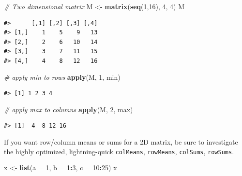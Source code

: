 \documentclass[]{book}
\newenvironment{Shaded}{\begin{snugshade}}{\end{snugshade}}
\newcommand{\KeywordTok}[1]{\textcolor[rgb]{0.13,0.29,0.53}{\textbf{#1}}}
\newcommand{\DataTypeTok}[1]{\textcolor[rgb]{0.13,0.29,0.53}{#1}}
\newcommand{\DecValTok}[1]{\textcolor[rgb]{0.00,0.00,0.81}{#1}}
\newcommand{\StringTok}[1]{\textcolor[rgb]{0.31,0.60,0.02}{#1}}
\newcommand{\CommentTok}[1]{\textcolor[rgb]{0.56,0.35,0.01}{\textit{#1}}}
\newcommand{\OperatorTok}[1]{\textcolor[rgb]{0.81,0.36,0.00}{\textbf{#1}}}
\newcommand{\NormalTok}[1]{#1}
\theoremstyle{definition}
\theoremstyle{definition}
\theoremstyle{definition}
\theoremstyle{remark}
\begin{document}
\begin{Shaded}
\begin{Highlighting}[]
\CommentTok{# Two dimensional matrix}
\NormalTok{M <-}\StringTok{ }\KeywordTok{matrix}\NormalTok{(}\KeywordTok{seq}\NormalTok{(}\DecValTok{1}\NormalTok{,}\DecValTok{16}\NormalTok{), }\DecValTok{4}\NormalTok{, }\DecValTok{4}\NormalTok{)}
\NormalTok{M}
\end{Highlighting}
\end{Shaded}

\begin{verbatim}
#>      [,1] [,2] [,3] [,4]
#> [1,]    1    5    9   13
#> [2,]    2    6   10   14
#> [3,]    3    7   11   15
#> [4,]    4    8   12   16
\end{verbatim}

\begin{Shaded}
\begin{Highlighting}[]
\CommentTok{# apply min to rows}
\KeywordTok{apply}\NormalTok{(M, }\DecValTok{1}\NormalTok{, min)}
\end{Highlighting}
\end{Shaded}

\begin{verbatim}
#> [1] 1 2 3 4
\end{verbatim}

\begin{Shaded}
\begin{Highlighting}[]
\CommentTok{# apply max to columns}
\KeywordTok{apply}\NormalTok{(M, }\DecValTok{2}\NormalTok{, max)}
\end{Highlighting}
\end{Shaded}

\begin{verbatim}
#> [1]  4  8 12 16
\end{verbatim}

If you want row/column means or sums for a 2D matrix, be sure to
investigate the highly optimized, lightning-quick \texttt{colMeans},
\texttt{rowMeans}, \texttt{colSums}, \texttt{rowSums}.

\begin{Shaded}
\begin{Highlighting}[]
\NormalTok{x <-}\StringTok{ }\KeywordTok{list}\NormalTok{(}\DataTypeTok{a =} \DecValTok{1}\NormalTok{, }\DataTypeTok{b =} \DecValTok{1}\OperatorTok{:}\DecValTok{3}\NormalTok{, }\DataTypeTok{c =} \DecValTok{10}\OperatorTok{:}\DecValTok{25}\NormalTok{)}
\NormalTok{x}
\end{Highlighting}
\end{Shaded}
\end{document}
